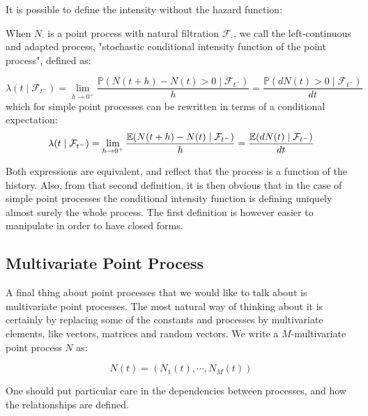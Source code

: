 It is possible to define the intensity without the hazard function:


\begin{definition}
When $N_{\cdot}$ is a point process with natural filtration $\mathcal F_{\cdot}$, we call the left-continuous and adapted process, "stochastic conditional intensity function of the point process", defined as:

\begin{equation}
 \lambda(t \mid \mathcal F_{t^-} ) = \lim_{h \to 0^+ } \frac{\mathbb P( N(t+h) - N(t) > 0 \mid \mathcal F_{t^-} )} {h} = \frac{\mathbb P ( dN(t) > 0  \mid \mathcal F_{t^-}) }{dt}
\end{equation}
which for simple point processes can be rewritten in terms of a conditional expectation:
\begin{equation}
 \lambda(t \mid \mathcal F_{t^-} ) = \lim_{h \to 0^+ } \frac{\mathbb E( N(t+h) - N(t)  \mid \mathcal F_{t^-} )} {h} = \frac{\mathbb E ( dN(t)  \mid \mathcal F_{t^-}) }{dt}
\label{eq:conditional_filtration}
\end{equation}
\end{definition}

Both expressions are equivalent, and reflect that the process is a function of the history. Also, from that second definition, it is then obvious that in the case of simple point processes the conditional intensity function is defining uniquely almost surely the whole process. The first definition is however easier to manipulate in order to have closed forms.


\subsection{Multivariate Point Process}
A final thing about point processes that we would like to talk about is multivariate point processes. The most natural way of thinking about it is certainly by replacing some of the constants and processes by multivariate elements, like vectors, matrices and random vectors. We write a $M$-multivariate point process $N$ as:

\begin{equation}
N(t) = \left ( N_1(t), \cdots, N_M(t) \right )
\end{equation}

One should put particular care in the dependencies between processes, and how the relationships are defined. 












